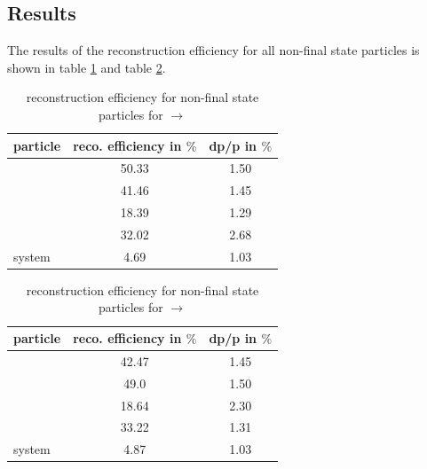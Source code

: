 	\subsection*{Results}
	
	The results of the reconstruction efficiency for all non-final state particles is shown in table \ref{tab:non-finalstate_efficiency}
	and table \ref{tab:non-finalstate_efficiency_cc}.
	
	\begin{table}
		\centering
		\caption{\propose reconstruction efficiency for non-final state particles for \pbarpSystem $\rightarrow$ \excitedcascade \anticascade}
		\label{tab:non-finalstate_efficiency}
		
		\begin{tabular}{lcc}
		
			\hline
			particle & reco. efficiency in $\%$ & dp/p in $\%$ \\\hline
			\hline
			\lam & 50.33&   1.50 \\
			\alam & 41.46&   1.45\\
			\anticascade & 18.39&   1.29\\
			\excitedcascade & 32.02&   2.68 \\
			\excitedcascade \anticascade system & 4.69&   1.03\\\hline
			 	
		\end{tabular}
	\end{table}
	
		\begin{table}
		\centering
		\caption{\propose reconstruction efficiency for non-final state particles for \pbarpSystem $\rightarrow$ \excitedanticascade \cascade}
		\label{tab:non-finalstate_efficiency_cc}
		
		\begin{tabular}{lcc}
		
			\hline
			particle & reco. efficiency in $\%$ & dp/p in $\%$ \\\hline
			\hline
			\lam & 42.47&   1.45 \\
			\alam & 49.0&   1.50\\
			\cascade & 18.64&   2.30\\
			\excitedanticascade & 33.22&   1.31\\
			\excitedanticascade \cascade system & 4.87&   1.03\\\hline
			 	
		\end{tabular}
	\end{table}
	
